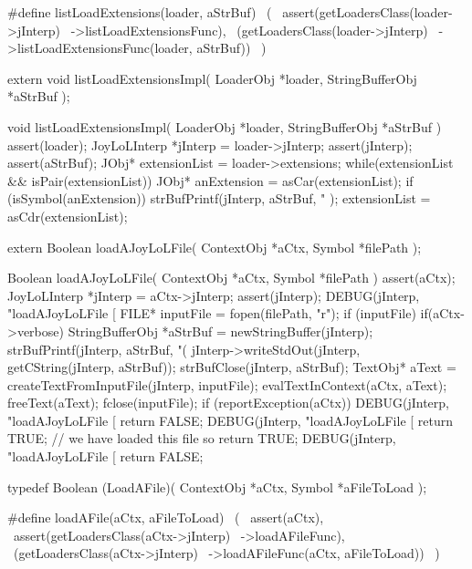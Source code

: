 \startCHeader
#define listLoadExtensions(loader, aStrBuf)      \
  (                                              \
    assert(getLoadersClass(loader->jInterp)      \
      ->listLoadExtensionsFunc),                 \
    (getLoadersClass(loader->jInterp)            \
      ->listLoadExtensionsFunc(loader, aStrBuf)) \
  )
\stopCHeader

\setCHeaderStream{private}
\startCHeader
extern void listLoadExtensionsImpl(
  LoaderObj       *loader,
  StringBufferObj *aStrBuf
);
\stopCHeader
{}

\startCCode
void listLoadExtensionsImpl(
  LoaderObj       *loader,
  StringBufferObj *aStrBuf
) {
  assert(loader);
  JoyLoLInterp *jInterp = loader->jInterp;
  assert(jInterp);
  assert(aStrBuf);
  JObj* extensionList = loader->extensions;
  while(extensionList && isPair(extensionList)) {
    JObj* anExtension = asCar(extensionList);
    if (isSymbol(anExtension)) {
      strBufPrintf(jInterp, aStrBuf,
        "%
      );
    }
    extensionList = asCdr(extensionList);
  }
}
\stopCCode

\startCHeader
extern Boolean loadAJoyLoLFile(
  ContextObj *aCtx,
  Symbol     *filePath
);
\stopCHeader
{}

\startCCode
Boolean loadAJoyLoLFile(
  ContextObj *aCtx,
  Symbol     *filePath
) {
  assert(aCtx);
  JoyLoLInterp *jInterp = aCtx->jInterp;
  assert(jInterp);
  DEBUG(jInterp, "loadAJoyLoLFile [%
  FILE* inputFile = fopen(filePath, "r");
  if (inputFile) {
    if(aCtx->verbose) {
      StringBufferObj *aStrBuf = 
        newStringBuffer(jInterp);      
      strBufPrintf(jInterp, aStrBuf, "(%
      jInterp->writeStdOut(jInterp, getCString(jInterp, aStrBuf));
      strBufClose(jInterp, aStrBuf);
    }
    TextObj* aText =
      createTextFromInputFile(jInterp, inputFile);
    evalTextInContext(aCtx, aText);
    freeText(aText);
    fclose(inputFile);
    if (reportException(aCtx)) {
      DEBUG(jInterp, "loadAJoyLoLFile [%
      return FALSE;
    }
    DEBUG(jInterp, "loadAJoyLoLFile [%
    return TRUE; // we have loaded this file so return TRUE;
  }
  DEBUG(jInterp, "loadAJoyLoLFile [%
  return FALSE;
}
\stopCCode

\startCHeader
typedef Boolean (LoadAFile)(
  ContextObj *aCtx,
  Symbol     *aFileToLoad
);

#define loadAFile(aCtx, aFileToLoad)       \
  (                                        \
    assert(aCtx),                          \
    assert(getLoadersClass(aCtx->jInterp)  \
      ->loadAFileFunc),                    \
    (getLoadersClass(aCtx->jInterp)        \
      ->loadAFileFunc(aCtx, aFileToLoad))  \
  )
\stopCHeader

